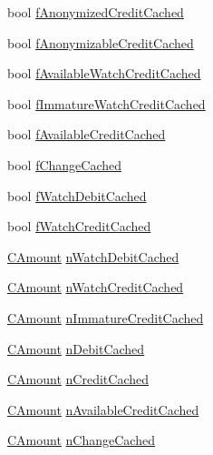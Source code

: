 \begin{DoxyCompactItemize}
\item 
bool \hyperlink{class_c_wallet_tx_acec9ac9932baf1ca07e5b270f50d8f7e}{f\+Anonymized\+Credit\+Cached}
\item 
bool \hyperlink{class_c_wallet_tx_a5906462dc235739a410253a889c7c250}{f\+Anonymizable\+Credit\+Cached}
\item 
bool \hyperlink{class_c_wallet_tx_a5f15653f1307c561520a4fa26a12db33}{f\+Available\+Watch\+Credit\+Cached}
\item 
bool \hyperlink{class_c_wallet_tx_a15c52b4c9a7ee5e87f86324c7e08fe96}{f\+Immature\+Watch\+Credit\+Cached}
\item 
bool \hyperlink{class_c_wallet_tx_ac059d14ddf84de69430c57a12573b412}{f\+Available\+Credit\+Cached}
\item 
bool \hyperlink{class_c_wallet_tx_ab436a962e5e32d392928bc68af968bf1}{f\+Change\+Cached}
\item 
bool \hyperlink{class_c_wallet_tx_a803d33ac2e13c964a2778bd575f5c69c}{f\+Watch\+Debit\+Cached}
\item 
bool \hyperlink{class_c_wallet_tx_abbe2fa89b594fd1c931572bdf7b7a4cd}{f\+Watch\+Credit\+Cached}
\item 
\hyperlink{amount_8h_a4eaf3a5239714d8c45b851527f7cb564}{C\+Amount} \hyperlink{class_c_wallet_tx_aae59608618174f5c2dc4fa6036ffb76b}{n\+Watch\+Debit\+Cached}
\item 
\hyperlink{amount_8h_a4eaf3a5239714d8c45b851527f7cb564}{C\+Amount} \hyperlink{class_c_wallet_tx_ad5585350b3917d52e0f0c54fbd8f48ba}{n\+Watch\+Credit\+Cached}
\item 
\hyperlink{amount_8h_a4eaf3a5239714d8c45b851527f7cb564}{C\+Amount} \hyperlink{class_c_wallet_tx_a6b9278766d4c82554b8b4976bff3ef2c}{n\+Immature\+Credit\+Cached}
\item 
\hyperlink{amount_8h_a4eaf3a5239714d8c45b851527f7cb564}{C\+Amount} \hyperlink{class_c_wallet_tx_aafed9b6aeecef4f9159ee73a8d69262d}{n\+Debit\+Cached}
\item 
\hyperlink{amount_8h_a4eaf3a5239714d8c45b851527f7cb564}{C\+Amount} \hyperlink{class_c_wallet_tx_a6f6b791fc148e3ce053e229f8fe83496}{n\+Credit\+Cached}
\item 
\hyperlink{amount_8h_a4eaf3a5239714d8c45b851527f7cb564}{C\+Amount} \hyperlink{class_c_wallet_tx_a095729d9d744bb1a47d07952f8aa159e}{n\+Available\+Credit\+Cached}
\item 
\hyperlink{amount_8h_a4eaf3a5239714d8c45b851527f7cb564}{C\+Amount} \hyperlink{class_c_wallet_tx_af324c0c303c44aea9c790e782187343e}{n\+Change\+Cached}
\item 

\end{DoxyCompactItemize}
